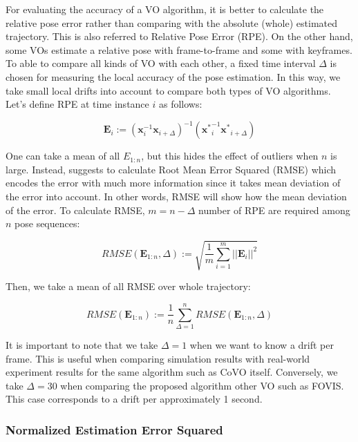\documentclass[12pt]{report}
\numberwithin{figure}{section}
\begin{document}
For evaluating the accuracy of a VO algorithm, it is better to calculate the 
relative pose error rather than comparing with the absolute (whole) estimated 
trajectory. This is also referred to Relative Pose Error (RPE).  On the other 
hand, some VOs estimate a relative pose with frame-to-frame and some with 
keyframes.  To able to compare all kinds of VO with each other, a fixed time 
interval $\Delta$ is chosen for measuring the local accuracy of the pose 
estimation.  In this way, we take small local drifts into account to compare 
both types of VO algorithms.  Let's define RPE at time instance $i$ as follows:

\begin{equation}
  \mathbf{E}_i := 
  (\mathbf{x}_i^{-1} \mathbf{x}_{i+\Delta})^{-1} 
  (\mathbf{x^*}_i^{-1}\mathbf{x^*}_{i+\Delta})
\end{equation}

One can take a mean of all $E_{1:n}$, but this hides the effect of outliers 
when $n$ is large.  Instead, \parencite{Sturm2012a} suggests to calculate Root 
Mean Error 
Squared (RMSE) which encodes the error with much more information since it 
takes mean deviation of the error into account.
In other words, RMSE will show how the mean deviation of the error.  To calculate RMSE, $m = n - \Delta$ number of RPE are required among $n$ pose sequences:

\begin{equation}
  RMSE(\mathbf{E}_{1:n},\Delta) := \sqrt{\frac{1}{m} \sum_{i=1}^{m}||\mathbf{E}_i||^2}
\end{equation}

Then, we take a mean of all RMSE over whole trajectory:

\begin{equation}
  RMSE(\mathbf{E}_{1:n}) :=  \frac{1}{n} \sum_{\Delta=1}^{n}RMSE(\mathbf{E}_{1:n},\Delta)
\end{equation}

It is important to note that we take $\Delta=1$ when we want to know 
a drift per frame. This is useful when comparing simulation results with 
real-world experiment results for the same algorithm such as CoVO itself. 
Conversely, we take $\Delta=30$ when comparing 
the proposed algorithm other VO such as FOVIS. This case corresponds to a drift per approximately 
1 second.

\subsubsection{Normalized Estimation Error Squared}
\end{document}

